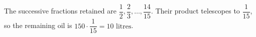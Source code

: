 The successive fractions retained are $\dfrac{1}{2},\dfrac{2}{3},\ldots,\dfrac{14}{15}$. Their product telescopes to $\dfrac{1}{15}$, so the remaining oil is $150\cdot\dfrac{1}{15}=\boxed{10\text{ litres}}$.
